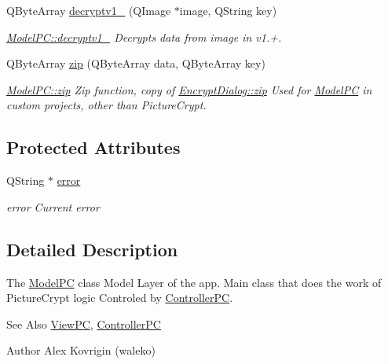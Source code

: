 \begin{DoxyCompactItemize}
Q\-Byte\-Array \hyperlink{class_model_p_c_a7a1f7d491e1bde16936190b9e90896b0}{decryptv1\-\_} (Q\-Image $\ast$image, Q\-String key)
\begin{DoxyCompactList}\small\item\em \hyperlink{class_model_p_c_a7a1f7d491e1bde16936190b9e90896b0}{Model\-P\-C\-::decryptv1\-\_} Decrypts data from image in v1.+. \end{DoxyCompactList}\item 
Q\-Byte\-Array \hyperlink{class_model_p_c_afebbbfa4b07deba4f68fc6dfb50f353f}{zip} (Q\-Byte\-Array data, Q\-Byte\-Array key)
\begin{DoxyCompactList}\small\item\em \hyperlink{class_model_p_c_afebbbfa4b07deba4f68fc6dfb50f353f}{Model\-P\-C\-::zip} Zip function, copy of \hyperlink{class_encrypt_dialog_a2bff820a3df4ddc36ecb07ed74b7138a}{Encrypt\-Dialog\-::zip} Used for \hyperlink{class_model_p_c}{Model\-P\-C} in custom projects, other than Picture\-Crypt. \end{DoxyCompactList}\end{DoxyCompactItemize}
\subsection*{Protected Attributes}
\begin{DoxyCompactItemize}
\item 
Q\-String $\ast$ \hyperlink{class_model_p_c_a4e5a9c0ca1f06fe5bc478b6bf248c37c}{error}
\begin{DoxyCompactList}\small\item\em error Current error \end{DoxyCompactList}\end{DoxyCompactItemize}


\subsection{Detailed Description}
The \hyperlink{class_model_p_c}{Model\-P\-C} class Model Layer of the app. Main class that does the work of Picture\-Crypt logic Controled by \hyperlink{class_controller_p_c}{Controller\-P\-C}. 

\begin{DoxySeeAlso}{See Also}
\hyperlink{class_view_p_c}{View\-P\-C}, \hyperlink{class_controller_p_c}{Controller\-P\-C} 
\end{DoxySeeAlso}
\begin{DoxyAuthor}{Author}
Alex Kovrigin (waleko) 
\end{DoxyAuthor}


